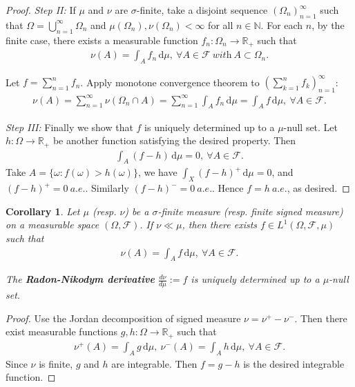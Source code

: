 \documentclass{article}
\numberwithin{equation}{section}
\renewcommand{\d}{\mathrm{d}}
\theoremstyle{plain}
\newtheorem{corollary}[theorem]{Corollary}
\theoremstyle{definition}
\begin{document}
\begin{proof}
\item\textit{Step II:} If $\mu$ and $\nu$ are $\sigma$-finite, take a disjoint sequence $(\Omega_n)_{n=1}^\infty$ such that $\Omega=\bigcup_{n=1}^\infty\Omega_n$ and $\mu(\Omega_n),\nu(\Omega_n)<\infty$ for all $n\in\mathbb{N}$. For each $n$, by the finite case, there exists a measurable function $f_n:\Omega_n\to\mathbb{R}_+$ such that
\begin{align*}
	\nu(A)=\int_A f_n\,\d \mu,\ \forall A\in\mathscr{F}\ \textit{with}\ A\subset\Omega_n.
\end{align*}

Let $f=\sum_{n=1}^n f_n$. Apply monotone convergence theorem to $\left(\sum_{k=1}^n f_k\right)_{n=1}^\infty$:
\begin{align*}
	\nu(A) = \sum_{n=1}^\infty\nu(\Omega_n\cap A) = \sum_{n=1}^\infty \int_{A} f_n\,\d \mu = \int_A f\,\d \mu,\ \forall A\in\mathscr{F}.
\end{align*}

\item\textit{Step III:} Finally we show that $f$ is uniquely determined up to a $\mu$-null set. Let $h:\Omega\to\mathbb{R}_+$ be another function satisfying the desired property. Then
\begin{align*}
	\int_A (f-h)\,\d \mu = 0,\ \forall A\in\mathscr{F}.
\end{align*}
Take $A=\{\omega:f(\omega)>h(\omega)\}$, we have $\int_X(f-h)^+\,\d \mu=0$, and $(f-h)^+=0\ a.e.$. Similarly $(f-h)^-=0\ a.e.$. Hence $f=h\ a.e.$, as desired.
\end{proof}

\begin{corollary}\label{cor:1.59} Let $\mu$ (resp. $\nu$) be a $\sigma$-finite measure (resp. finite signed measure) on a measurable space $(\Omega,\mathscr{F})$. If $\nu\ll\mu$, then there exists $f\in L^1(\Omega,\mathscr{F},\mu)$ such that
\begin{align*}
	\nu(A)=\int_A f\,\d \mu,\ \forall A\in\mathscr{F}.
\end{align*}

The \textbf{Radon-Nikodym derivative} $\frac{d\nu}{d\mu}:=f$ is uniquely determined up to a $\mu$-null set.
\end{corollary}
\begin{proof}
Use the Jordan decomposition of signed measure $\nu=\nu^+-\nu^-$. Then there exist measurable functions $g,h:\Omega\to\mathbb{R}_+$ such that
\begin{align*}
	\nu^+(A)=\int_A g\,\d \mu,\ \nu^-(A)=\int_A h\,\d \mu,\ \forall A\in\mathscr{F}.
\end{align*}
Since $\nu$ is finite, $g$ and $h$ are integrable. Then $f=g-h$ is the desired integrable function.
\end{proof}
\end{document}
